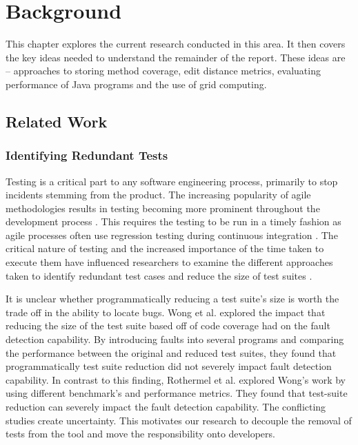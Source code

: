 \chapter{Background}\label{C:related}

This chapter explores the current research conducted in this area. It then covers the key ideas needed to understand the remainder of the report. These ideas are -- approaches to storing method coverage, edit distance metrics, evaluating performance of Java programs and the use of grid computing.

\section{Related Work}
\label{relatedworkRef}
\subsection{Identifying Redundant Tests}
Testing is a critical part to any software engineering process, primarily to stop incidents stemming from the product. The increasing popularity of agile methodologies \cite{export:56015} results in testing becoming more prominent throughout the development process \cite{beck2000extreme} \cite{ibmagile}. This requires the testing to be run in a timely fashion as agile processes often use regression testing during continuous integration \cite{Parsons:2014:IRT:2678316.2678331}. The critical nature of testing and the increased importance of the time taken to execute them have influenced researchers to examine the different approaches taken to identify redundant test cases and reduce the size of test suites \cite{wong1995effect, wong1999test, rothermel1998empirical, rothermel2002empirical,koochakzadeh2009test,zhang2011empirical,li2008static}.

It is unclear whether programmatically reducing a test suite's size is worth the trade off in the ability to locate bugs. Wong et al. \cite{wong1995effect, wong1999test} explored the impact that reducing the size of the test suite based off of code coverage had on the fault detection capability. By introducing faults into several programs and comparing the performance between the original and reduced test suites, they found that programmatically test suite reduction did not severely impact fault detection capability. In contrast to this finding, Rothermel et al. \cite{rothermel1998empirical, rothermel2002empirical} explored Wong's work by using different benchmark's and performance metrics. They found that test-suite reduction can severely impact the fault detection capability. The conflicting studies create uncertainty. This motivates our research to decouple the removal of tests from the tool and move the responsibility onto developers. 


